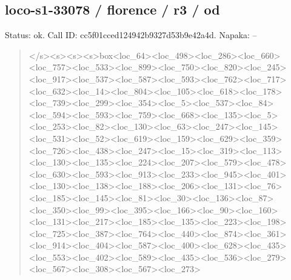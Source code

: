 \documentclass[10pt,a4paper]{article}
\begin{document}
\subsection*{loco-s1-33078 / florence / r3 / od}
Status: ok. Call ID: cc5f01cced124942b9327d53b9e42a4d. Napaka: --
\begin{quote}\footnotesize
</s>\allowbreak{}<s>\allowbreak{}<s>\allowbreak{}<s>\allowbreak{}box<loc\_64>\allowbreak{}<loc\_498\allowbreak{}>\allowbreak{}<loc\_286>\allowbreak{}<loc\_660>\allowbreak{}<loc\_757>\allowbreak{}<loc\allowbreak{}\_533>\allowbreak{}<loc\_899>\allowbreak{}<loc\_750>\allowbreak{}<loc\_820>\allowbreak{}\allowbreak{}<loc\_245>\allowbreak{}<loc\_917>\allowbreak{}<loc\_537>\allowbreak{}<loc\_\allowbreak{}587>\allowbreak{}<loc\_593>\allowbreak{}<loc\_762>\allowbreak{}<loc\_717>\allowbreak{}<\allowbreak{}loc\_632>\allowbreak{}<loc\_14>\allowbreak{}<loc\_804>\allowbreak{}<loc\_10\allowbreak{}5>\allowbreak{}<loc\_618>\allowbreak{}<loc\_178>\allowbreak{}<loc\_739>\allowbreak{}<lo\allowbreak{}c\_299>\allowbreak{}<loc\_354>\allowbreak{}<loc\_5>\allowbreak{}<loc\_537>\allowbreak{}<\allowbreak{}loc\_84>\allowbreak{}<loc\_594>\allowbreak{}<loc\_593>\allowbreak{}<loc\_75\allowbreak{}9>\allowbreak{}<loc\_668>\allowbreak{}<loc\_135>\allowbreak{}<loc\_5>\allowbreak{}<loc\_\allowbreak{}253>\allowbreak{}<loc\_82>\allowbreak{}<loc\_130>\allowbreak{}<loc\_63>\allowbreak{}<lo\allowbreak{}c\_247>\allowbreak{}<loc\_145>\allowbreak{}<loc\_531>\allowbreak{}<loc\_52>\allowbreak{}\allowbreak{}<loc\_619>\allowbreak{}<loc\_159>\allowbreak{}<loc\_629>\allowbreak{}<loc\_\allowbreak{}359>\allowbreak{}<loc\_726>\allowbreak{}<loc\_438>\allowbreak{}<loc\_247>\allowbreak{}<\allowbreak{}loc\_15>\allowbreak{}<loc\_319>\allowbreak{}<loc\_113>\allowbreak{}<loc\_13\allowbreak{}0>\allowbreak{}<loc\_135>\allowbreak{}<loc\_224>\allowbreak{}<loc\_207>\allowbreak{}<lo\allowbreak{}c\_579>\allowbreak{}<loc\_478>\allowbreak{}<loc\_630>\allowbreak{}<loc\_593\allowbreak{}>\allowbreak{}<loc\_913>\allowbreak{}<loc\_233>\allowbreak{}<loc\_945>\allowbreak{}<loc\allowbreak{}\_401>\allowbreak{}<loc\_130>\allowbreak{}<loc\_138>\allowbreak{}<loc\_188>\allowbreak{}\allowbreak{}<loc\_206>\allowbreak{}<loc\_131>\allowbreak{}<loc\_76>\allowbreak{}<loc\_1\allowbreak{}85>\allowbreak{}<loc\_145>\allowbreak{}<loc\_81>\allowbreak{}<loc\_30>\allowbreak{}<loc\allowbreak{}\_136>\allowbreak{}<loc\_87>\allowbreak{}<loc\_350>\allowbreak{}<loc\_99>\allowbreak{}<l\allowbreak{}oc\_395>\allowbreak{}<loc\_166>\allowbreak{}<loc\_90>\allowbreak{}<loc\_160\allowbreak{}>\allowbreak{}<loc\_131>\allowbreak{}<loc\_217>\allowbreak{}<loc\_185>\allowbreak{}<loc\allowbreak{}\_135>\allowbreak{}<loc\_223>\allowbreak{}<loc\_198>\allowbreak{}<loc\_725>\allowbreak{}\allowbreak{}<loc\_387>\allowbreak{}<loc\_764>\allowbreak{}<loc\_440>\allowbreak{}<loc\_\allowbreak{}874>\allowbreak{}<loc\_361>\allowbreak{}<loc\_914>\allowbreak{}<loc\_404>\allowbreak{}<\allowbreak{}loc\_587>\allowbreak{}<loc\_400>\allowbreak{}<loc\_628>\allowbreak{}<loc\_4\allowbreak{}35>\allowbreak{}<loc\_553>\allowbreak{}<loc\_402>\allowbreak{}<loc\_589>\allowbreak{}<l\allowbreak{}oc\_435>\allowbreak{}<loc\_536>\allowbreak{}<loc\_279>\allowbreak{}<loc\_56\allowbreak{}7>\allowbreak{}<loc\_308>\allowbreak{}<loc\_567>\allowbreak{}<loc\_273>\allowbr
\end{quote}
\end{document}
